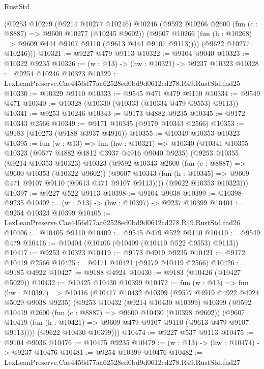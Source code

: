 \begin{lexlean}{RustStd}
\begin{coremodule}
      (@9253
        @10279
        (@9214 @10277 @10246)
        @10246
        (@9592
          @10266
          @2600
          (fun (c : @8887) => @9600 @10277 (@10245 @9602))
          (@9607 @10266 (fun (h : @10268) => @9609 @444 @9107 @9110 (@9613 @444 @9107 @9113))))
        (@9622 @10277 @10246)))
@10321 := @9227 @479 @9113
@10322 := @9104 @9040
@10323 := @10322 @9235
@10326 := (w : @13) -> (hw : @10321) -> @9237 @10323
@10328 := @9254 @10246 @10323
@10329 := LexLeanPreserve.Cae4456d77aa62528ed0bd9d0612cd278.R49.RustStd.fnd25
@10330 := @10329 @9110
@10333 := @9545 @471 @479 @9110
@10334 := @9549 @471
@10340 := @10328 (@10330 (@10333 (@10334 @479 @9553) @9113))
@10341 := @9253 @10246
@10343 := @9173 @4882 @9235
@10345 := @9172 @10343 @2566
@10349 := @9171 @10345 (@9179 @10343 @2566)
@10353 := @9183 (@10273 (@9188 @3937 @4916))
@10355 := @10349 @10353 @10323
@10395 := fun (w : @13) =>
  fun (hw : @10321) =>
  @10340
    (@10341
      @10355
      @10323
      (@9577 @4882 @4812 @3937 @4916 @9040 @9235)
      (@9253
        @10355
        (@9214 @10353 @10323)
        @10323
        (@9592
          @10343
          @2600
          (fun (c : @8887) => @9600 @10353 (@10322 @9602))
          (@9607 @10343 (fun (h : @10345) => @9609 @471 @9107 @9110 (@9613 @471 @9107 @9113))))
        (@9622 @10353 @10323)))
@10397 := @9227 @522 @9113
@10398 := @9104 @9038
@10399 := @10398 @9235
@10402 := (w : @13) -> (hw : @10397) -> @9237 @10399
@10404 := @9254 @10323 @10399
@10405 := LexLeanPreserve.Cae4456d77aa62528ed0bd9d0612cd278.R49.RustStd.fnd26
@10406 := @10405 @9110
@10409 := @9545 @479 @522 @9110
@10410 := @9549 @479
@10416 := @10404 (@10406 (@10409 (@10410 @522 @9553) @9113))
@10417 := @9253 @10323
@10419 := @9173 @4919 @9235
@10421 := @9172 @10419 @2566
@10425 := @9171 @10421 (@9179 @10419 @2566)
@10426 := @9185 @4922
@10427 := @9188 @4924
@10430 := @9183 (@10426 (@10427 @5029))
@10432 := @10425 @10430 @10399
@10472 := fun (w : @13) =>
  fun (hw : @10397) =>
  @10416
    (@10417
      @10432
      @10399
      (@9577 @4919 @4922 @4924 @5029 @9038 @9235)
      (@9253
        @10432
        (@9214 @10430 @10399)
        @10399
        (@9592
          @10419
          @2600
          (fun (c : @8887) => @9600 @10430 (@10398 @9602))
          (@9607 @10419 (fun (h : @10421) => @9609 @479 @9107 @9110 (@9613 @479 @9107 @9113))))
        (@9622 @10430 @10399)))
@10474 := @9227 @537 @9113
@10475 := @9104 @9036
@10476 := @10475 @9235
@10479 := (w : @13) -> (hw : @10474) -> @9237 @10476
@10481 := @9254 @10399 @10476
@10482 := LexLeanPreserve.Cae4456d77aa62528ed0bd9d0612cd278.R49.RustStd.fnd27

\end{coremodule}
\end{lexlean}
